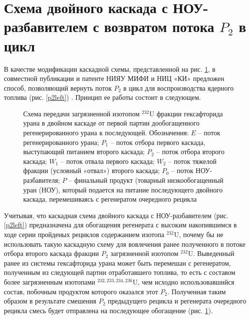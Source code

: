 \section{Схема двойного каскада с НОУ-разбавителем с возвратом потока $P_2$ в цикл}

В качестве модификации каскадной схемы, представленной на рис. \ref{P2utilizationRing}, в совместной публикации и патенте НИЯУ МИФИ и НИЦ «КИ» предложен способ, позволяющий вернуть поток $P_2$ в цикл для воспроизводства ядерного топлива (рис. \ref{p2left}) \cite{nevinicaToplivnyyCiklLegkovodnogo2019, nevinicaSposobIzotopnogoVosstanovleniya2019}. Принцип ее работы состоит в следующем.


\begin{figure}[ht]
    \caption{Схема передачи загрязненной изотопом $^{232}$U фракции гексафторида урана в двойном каскаде от первой партии дообогащенного регенерированного урана к последующей. Обозначения: $E$ -- поток регенерированного урана; $P_1$ -- поток отбора первого каскада, выступающий питанием второго каскада; $P_2$ -- поток отбора второго каскада; $W_1$ -- поток отвала первого каскада; $W_2$ -- поток тяжелой фракции (условный «отвал») второго каскада; $P_0$ -- поток НОУ-разбавителя; $P$ -- финальный продукт (товарный низкообогащенный уран (НОУ), который подается на питание последующего двойного каскада, перемешиваясь с регенератом очередного рецикла}\label{P2utilizationRing}
\end{figure}

Учитывая, что каскадная схема двойного каскада с НОУ-разбавителем (рис. \ref{p2left}) предназначена для обогащения регенерата с высоким накопившимся в ходе серии пройденых рециклов содержанием изотопа $^{232}$U, почему бы не использовать такую каскадную схему для вовлечения ранее полученного в потоке отбора второго каскада фракции $P_2$ загрязненной изотопом $^{232}$U. Выведенный ранее из системы гексафторида урана может быть перемешан с регенератом, полученным из следующей партии отработавшего топлива, то есть с составом более загрязненным изотопами $^{232,233,234,236}$U, чем исходно использовавшийся состав, побочным продуктом которого оказался этот $P_2$. Полученная таким образом в результате смешения $P_2$ предыдущего рецикла и регенерата очередного рецикла смесь будет отправлена на последующее обогащение (рис. \ref{P2utilizationRing}).

